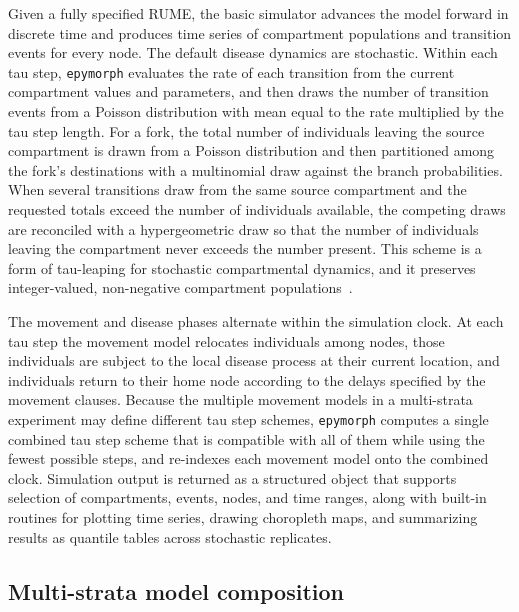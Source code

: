 Given a fully specified RUME, the basic simulator advances the model forward in discrete
time and produces time series of compartment populations and transition events for every
node. The default disease dynamics are stochastic. Within each tau step, \texttt{epymorph}
evaluates the rate of each transition from the current compartment values and parameters,
and then draws the number of transition events from a Poisson distribution with mean equal
to the rate multiplied by the tau step length. For a fork, the total number of individuals
leaving the source compartment is drawn from a Poisson distribution and then partitioned
among the fork's destinations with a multinomial draw against the branch probabilities. When
several transitions draw from the same source compartment and the requested totals exceed
the number of individuals available, the competing draws are reconciled with a
hypergeometric draw so that the number of individuals leaving the compartment never exceeds
the number present. This scheme is a form of tau-leaping for stochastic compartmental
dynamics, and it preserves integer-valued, non-negative compartment populations~\citep{gillespie_exact_1977,gillespie_approximate_2001}.

The movement and disease phases alternate within the simulation clock. At each tau step the
movement model relocates individuals among nodes, those individuals are subject to the local
disease process at their current location, and individuals return to their home node
according to the delays specified by the movement clauses. Because the multiple movement
models in a multi-strata experiment may define different tau step schemes, \texttt{epymorph}
computes a single combined tau step scheme that is compatible with all of them while using
the fewest possible steps, and re-indexes each movement model onto the combined clock.
Simulation output is returned as a structured object that supports selection of
compartments, events, nodes, and time ranges, along with built-in routines for plotting time
series, drawing choropleth maps, and summarizing results as quantile tables across
stochastic replicates.

\subsection{Multi-strata model composition}

